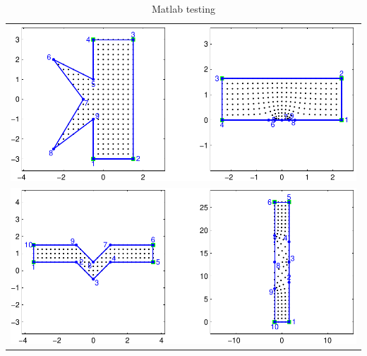 \documentclass[a4paper,10pt]{amsart}
\begin{document}
\begin{table}
\begin{tabular}{c}
\includegraphics[scale=0.5]{figs/matlab-test-5.pdf} \\
\includegraphics[scale=0.5]{figs/matlab-test-6.pdf} \\
\end{tabular}
\caption{Matlab testing}
\label{matlabtest}
\end{table}
\end{document}
